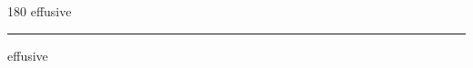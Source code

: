 
\begin{frame}
\begin{center}
\begin{turn}{180}
{\fontsize{2.5cm}{1em}\selectfont effusive}
\end{turn}
\vspace{1em}\par  
\hrule
\vspace{1em}\par  
{\fontsize{2.5cm}{1em}\selectfont effusive}
\end{center}
\end{frame}
